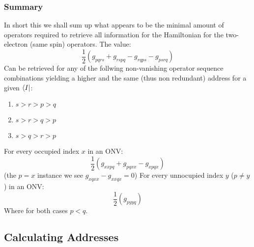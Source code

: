 \documentclass[12p]{article}
\begin{document}
\subsubsection{Summary}
In short this we shall sum up what appears to be the minimal amount of operators required to retrieve all information for the Hamiltonian for the two-electron (same spin) operators.
The value:
\begin{equation}
  \frac{1}{2} (g_{pqrs} + g_{rspq} - g_{rqps} - g_{psrq})
\end{equation}
 Can be retrieved for any of the follwing non-vanishing operator sequence combinations yielding a higher and the same (thus non redundant) address for a given $\bra{I}$:
\begin{enumerate}
  \item $s > r > p > q$
  \item $s > r > q > p$
  \item $s > q > r > p$
\end{enumerate}
For every occupied index $x$ in an ONV:
\begin{equation}
  \frac{1}{2} (g_{xxpq} + g_{pqxx} - g_{xpqx})
\end{equation}
(the $p = x$ instance we see $g_{xqxx} - g_{xxqx} = 0$)
For every unnocupied index $y$ ($p \neq y$) in an ONV:
\begin{equation}
  \frac{1}{2} (g_{pyyq})
\end{equation}
Where for both cases $p<q$.
\subsection{Calculating Addresses}
\end{document}
